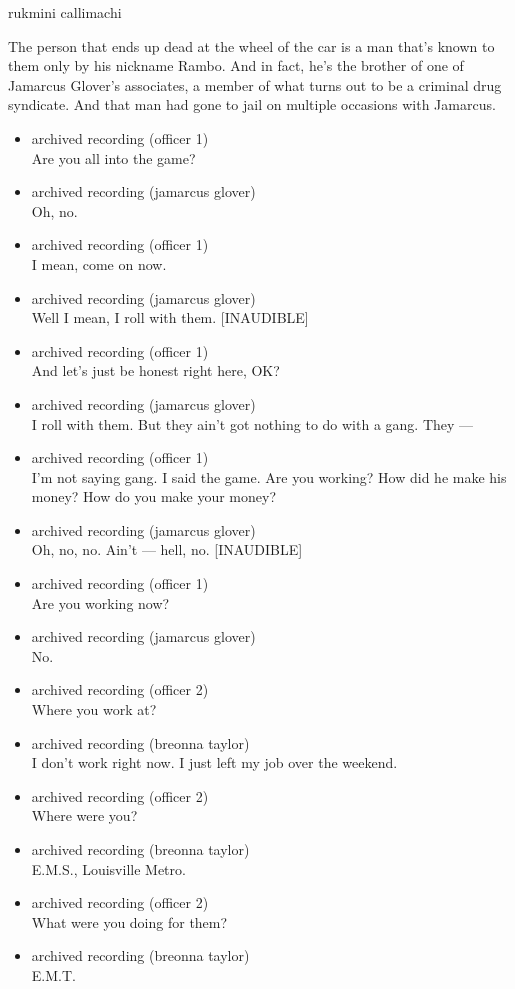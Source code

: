 rukmini callimachi

The person that ends up dead at the wheel of the car is a man that's
known to them only by his nickname Rambo. And in fact, he's the brother
of one of Jamarcus Glover's associates, a member of what turns out to be
a criminal drug syndicate. And that man had gone to jail on multiple
occasions with Jamarcus.

\begin{itemize}
\item
  archived recording (officer 1)\\
  Are you all into the game?
\item
  archived recording (jamarcus glover)\\
  Oh, no.
\item
  archived recording (officer 1)\\
  I mean, come on now.
\item
  archived recording (jamarcus glover)\\
  Well I mean, I roll with them. {[}INAUDIBLE{]}
\item
  archived recording (officer 1)\\
  And let's just be honest right here, OK?
\item
  archived recording (jamarcus glover)\\
  I roll with them. But they ain't got nothing to do with a gang. They
  ---
\item
  archived recording (officer 1)\\
  I'm not saying gang. I said the game. Are you working? How did he make
  his money? How do you make your money?
\item
  archived recording (jamarcus glover)\\
  Oh, no, no. Ain't --- hell, no. {[}INAUDIBLE{]}
\item
  archived recording (officer 1)\\
  Are you working now?
\item
  archived recording (jamarcus glover)\\
  No.
\item
  archived recording (officer 2)\\
  Where you work at?
\item
  archived recording (breonna taylor)\\
  I don't work right now. I just left my job over the weekend.
\item
  archived recording (officer 2)\\
  Where were you?
\item
  archived recording (breonna taylor)\\
  E.M.S., Louisville Metro.
\item
  archived recording (officer 2)\\
  What were you doing for them?
\item
  archived recording (breonna taylor)\\
  E.M.T.
\end{itemize}

